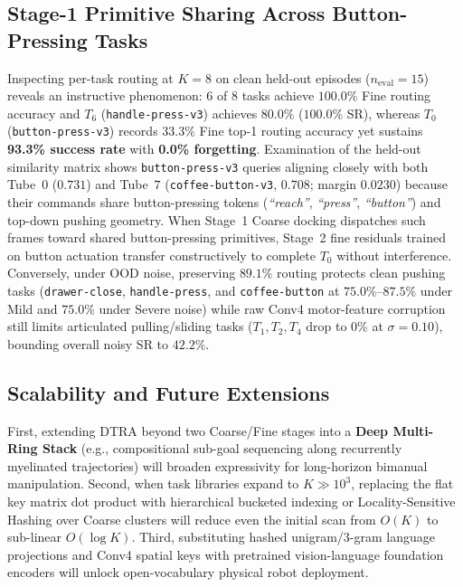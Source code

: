 \documentclass[10pt,twocolumn]{article}
\begin{document}
\subsection{Stage-1 Primitive Sharing Across Button-Pressing Tasks}
Inspecting per-task routing at $K=8$ on clean held-out episodes ($n_{\text{eval}}=15$) reveals an instructive phenomenon: $6$ of $8$ tasks achieve $100.0\%$ Fine routing accuracy and $T_6$ (\texttt{handle-press-v3}) achieves $80.0\%$ ($100.0\%$ SR), whereas $T_0$ (\texttt{button-press-v3}) records $33.3\%$ Fine top-1 routing accuracy yet sustains \textbf{93.3\% success rate} with \textbf{0.0\% forgetting}. Examination of the held-out similarity matrix shows \texttt{button-press-v3} queries aligning closely with both Tube~$0$ ($0.731$) and Tube~$7$ (\texttt{coffee-button-v3}, $0.708$; margin $0.0230$) because their commands share button-pressing tokens (\emph{``reach''}, \emph{``press''}, \emph{``button''}) and top-down pushing geometry. When Stage~1 Coarse docking dispatches such frames toward shared button-pressing primitives, Stage~2 fine residuals trained on button actuation transfer constructively to complete $T_0$ without interference. Conversely, under OOD noise, preserving $89.1\%$ routing protects clean pushing tasks (\texttt{drawer-close}, \texttt{handle-press}, and \texttt{coffee-button} at $75.0\%$--$87.5\%$ under Mild and $75.0\%$ under Severe noise) while raw Conv4 motor-feature corruption still limits articulated pulling/sliding tasks ($T_1, T_2, T_4$ drop to $0\%$ at $\sigma=0.10$), bounding overall noisy SR to $42.2\%$.

\subsection{Scalability and Future Extensions}
First, extending DTRA beyond two Coarse/Fine stages into a \textbf{Deep Multi-Ring Stack} (e.g., compositional sub-goal sequencing along recurrently myelinated trajectories) will broaden expressivity for long-horizon bimanual manipulation. Second, when task libraries expand to $K \gg 10^3$, replacing the flat key matrix dot product with hierarchical bucketed indexing or Locality-Sensitive Hashing over Coarse clusters will reduce even the initial scan from $O(K)$ to sub-linear $O(\log K)$. Third, substituting hashed unigram/3-gram language projections and Conv4 spatial keys with pretrained vision-language foundation encoders will unlock open-vocabulary physical robot deployment.

\end{document}
